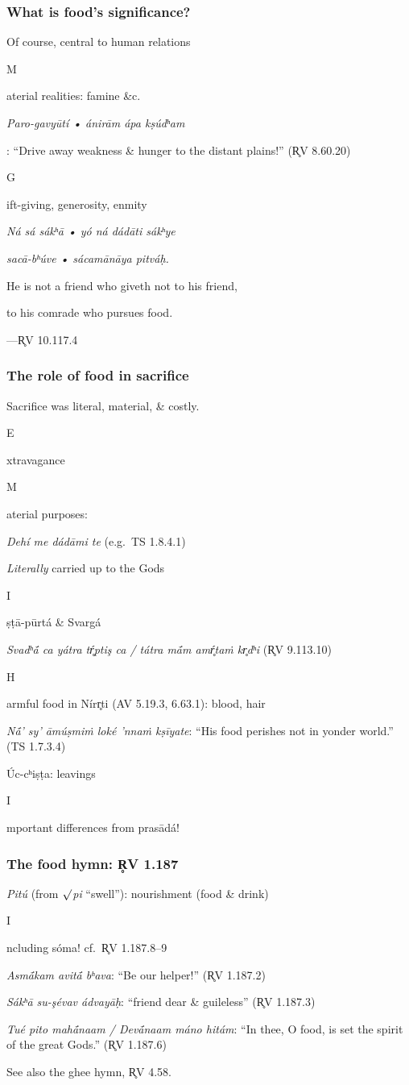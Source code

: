 \documentclass[pdf]{beamer}
\newcommand{\Subitem}[1]{{\setlength\itemindent{12pt} \item[-] #1}}
\newcommand{\Subsubitem}[1]{{\setlength\itemindent{24pt} \item[○] #1}}
\begin{document}
\begin{frame} \frametitle{What is food's significance?}
\begin{itemize}
	\item Of course, central to human relations
	\Subitem Material realities: famine \&c.
	\Subitem {\textit{Paro-gavyūtí • ánirām ápa kṣúdʰam}}: ``Drive away weakness \& hunger to the distant plains!'' (R̥V 8.60.20)
	\Subitem Gift-giving, generosity, enmity
\end{itemize}

\begin{center}
	\textit{Ná sá sákʰā • yó ná dádāti sákʰye}

	\textit{sacā-bʰúve • sácamānāya pitváḥ.}
	
	He is not a friend who giveth not to his friend,

	to his comrade who pursues food.

	---R̥V 10.117.4
\end{center}
\end{frame}

\begin{frame} \frametitle{The role of food in sacrifice}
\begin{itemize}
	\item Sacrifice was literal, material, \& costly.
	\Subitem Extravagance
	\Subitem Material purposes:
	\Subsubitem {{\textit{Dehí me dádāmi te} (e.g.~TS 1.8.4.1)}}
	\Subitem {\emph{Literally} carried up to the Gods}
	\Subsubitem Iṣṭā-pūrtá \& Svargá
	\Subsubitem {\textit{Svadʰā́ ca yátra tŕ̥ptiş ca / tátra mā́m amŕ̥taṁ kr̥dʰi} (R̥V 9.113.10)}
	\Subsubitem Harmful food in Nírr̥ti (AV 5.19.3, 6.63.1): blood, hair
	\Subsubitem {\textit{Nā́' sy' āmúṣmiṁ loké 'nnaṁ kṣīyate}: ``His food perishes not in yonder world.'' (TS 1.7.3.4)}
	\item Úc-cʰiṣṭa: leavings
	\Subitem Important differences from prasādá!
\end{itemize}
\end{frame}

\begin{frame} \frametitle{The food hymn: R̥V 1.187}
\begin{itemize}
	\item \textit{Pitú} (from $\surd$\textit{pi} ``swell''): nourishment (food \& drink)
	\Subitem Including sóma! cf.~R̥V 1.187.8--9
	\item \textit{Asmā́kam avitā́ bʰava}: ``Be our helper!'' (R̥V 1.187.2)
	\item \textit{Sákʰā su-şévav ádvayāḥ}: ``friend dear \& guileless''  (R̥V 1.187.3)
	\item \textit{Tué pito mahā́naam / Devā́naam máno hitám}: ``In thee, O food, is set the spirit of the great Gods.'' (R̥V 1.187.6)
	\item See also the ghee hymn, R̥V 4.58.
\end{itemize}
\end{frame}
\end{document}
